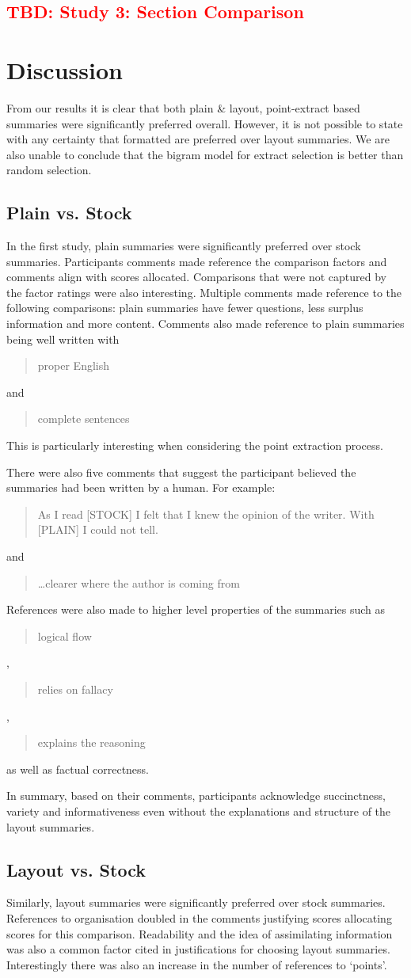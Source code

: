     \tocless\subsection{\textcolor{red}{TBD: Study 3: Section Comparison}}

  \section{Discussion}
    From our results it is clear that both plain \& layout, point-extract based summaries were significantly preferred overall. However, it is not possible to state with any certainty that formatted are preferred over layout summaries. We are also unable to conclude that the bigram model for extract selection is better than random selection.

    \tocless\subsection{Plain vs. Stock}
      In the first study, plain summaries were significantly preferred over stock summaries. Participants comments made reference the comparison factors and comments align with scores allocated. Comparisons that were not captured by the factor ratings were also interesting. Multiple comments made reference to the following comparisons: plain summaries have fewer questions, less surplus information and more content. Comments also made reference to plain summaries being well written with \blockquote{proper English} and \blockquote{complete sentences}. This is particularly interesting when considering the point extraction process.

      There were also five comments that suggest the participant believed the summaries had been written by a human. For example: \blockquote{As I read [STOCK] I felt that I knew the opinion of the writer. With [PLAIN] I could not tell.} and \blockquote{\dots clearer where the author is coming from}. References were also made to higher level properties of the summaries such as \blockquote{logical flow}, \blockquote{relies on fallacy}, \blockquote{explains the reasoning} as well as factual correctness.

      In summary, based on their comments, participants acknowledge succinctness, variety and informativeness even without the explanations and structure of the layout summaries.

    \tocless\subsection{Layout vs. Stock}
      Similarly, layout summaries were significantly preferred over stock summaries. References to organisation doubled in the comments justifying scores allocating scores for this comparison. Readability and the idea of assimilating information was also a common factor cited in justifications for choosing layout summaries. Interestingly there was also an increase in the number of references to `points'.

